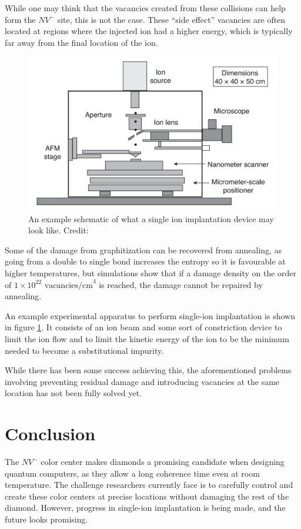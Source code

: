 \documentclass[12pt]{article}
\begin{document}
    While one may think that the vacancies created from these collisions can help form the $NV^{-}$ site, this is not the case. These ``side effect'' vacancies are often located at regions where the injected ion had a higher energy, which is typically far away from the final location of the ion\cite{Kalish2014}.
    \begin{figure}[h]
        \centering
        \includegraphics[width=0.7\linewidth]{figures/single-ion.jpg}
        \caption{An example schematic of what a single ion implantation device may look like. Credit: \cite{Kalish2014}}
        \label{fig:single-ion}
    \end{figure}

    Some of the damage from graphitization can be recovered from annealing, as going from a double to single bond increases the entropy so it is favourable at higher temperatures, but simulations show that if a damage density on the order of $1\times 10^{22} \text{ vacancies/cm}^3$ is reached, the damage cannot be repaired by annealing\cite{Kalish2014}.
    
    An example experimental apparatus to perform single-ion implantation is shown in figure \ref{fig:single-ion}. It consists of an ion beam and some sort of constriction device to limit the ion flow and to limit the kinetic energy of the ion to be the minimum needed to become a substitutional impurity.

    While there has been some success achieving this, the aforementioned problems involving preventing residual damage and introducing vacancies at the same location has not been fully solved yet\cite{Kalish2014}.
    \section{Conclusion}
    The $NV^{-}$ color center makes diamonds a promising candidate when designing quantum computers, as they allow a long coherence time even at room temperature. The challenge researchers currently face is to carefully control and create these color centers at precise locations without damaging the rest of the diamond. However, progress in single-ion implantation is being made, and the future looks promising.
    \newpage
    \printbibliography
\end{document}
